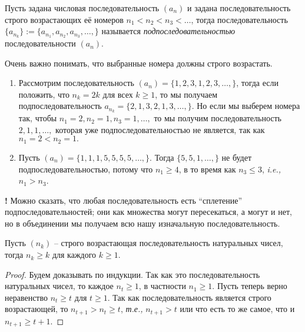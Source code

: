 \begin{definition}
    Пусть задана числовая последовательность $(a_n)$
    и задана последовательность строго возрастающих её номеров $n_1 <n_2< n_3 < \ldots$, тогда последовательность $\{a_{n_k}\}:= \{a_{n_1}, a_{n_2}, a_{n_3},\ldots,\}$ называется \textit{подпоследовательностью} последовательности $(a_n).$
\end{definition}

\begin{example}
    Очень важно понимать, что выбранные номера должны строго возрастать.
     \begin{enumerate}
         \item Рассмотрим последовательность $(a_n)=\{1,2,3,1,2,3,\ldots,\}$, тогда если положить, что $n_k = 2k$ для всех $k\ge 1$, то мы получаем подпоследовательность $a_{n_k} = \{2,1,3,2,1,3, \ldots,\}$. Но если мы выберем номера так, чтобы $n_1= 2, n_2 = 1, n_3=1, \ldots,$ то мы получим последовательность $2,1,1,\ldots,$ которая уже подпоследовательностью не является, так как $n_1 = 2 <n_2 = 1.$

         \item Пусть $(a_n) = \{1,1,1,5,5,5,5,\ldots,\}.$ Тогда $\{5,5,1,\ldots,\}$ не будет подпоследовательностью, потому что $n_1 \ge 4$, в то время как $n_3 \le 3$, \textit{i.e.,} $n_1 >n_3$.
     \end{enumerate}
\end{example}

\begin{mydanger}{\bf{!}}
    Можно сказать, что любая последовательность есть ``сплетение'' подпоследовательностей; они как множества могут пересекаться, а могут и нет, но в объединении мы получаем всю нашу изначальную последовательность.
\end{mydanger}

\begin{lemma}\label{n_k>=k}
    Пусть $ (n_k )$ -- строго возрастающая последовательность натуральных чисел, тогда $n_k \ge k$ для каждого $k\ge 1.$
\end{lemma}
\begin{proof}
    Будем доказывать по индукции. Так как это последовательность натуральных чисел, то каждое $n_t\ge 1$, в частности $n_1\ge 1$. Пусть теперь верно неравенство $n_t \ge t$ для $t\ge 1$. Так как последовательность является строго возрастающей, то $n_{t+1}>n_t \ge t$, \textit{т.е.,} $n_{t+1} >t$ или что есть то же самое, что и $n_{t+1}\ge t+1$.
\end{proof}

